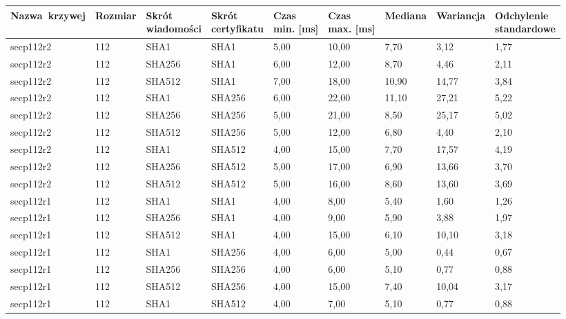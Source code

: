 \begin{longtable}{| l | l | l | l | l |l |l |l |l |}
\hline
\parbox[t]{25mm}{\centering Nazwa\ krzywej} & \parbox[t]{10mm}{\centering Rozmiar} & \parbox[t]{15mm}{\centering Skrót\\ wiadomości} & \parbox[t]{2cm}{\centering Skrót\\ certyfikatu} &  \parbox[t]{10mm}{\centering Czas\\  min. [ms]} & \parbox[t]{10mm}{\centering Czas\\ max. [ms]}  & \parbox[t]{2cm}{\centering Mediana} & \parbox[t]{2cm}{\centering Wariancja} & \parbox[t]{30mm}{\centering Odchylenie\\ standardowe} \\ \hline 
\endhead
secp112r2 & 112 & SHA1 & SHA1 & 5,00 & 10,00 & 7,70 & 3,12 & 1,77 \\ \hline 
secp112r2 & 112 & SHA256 & SHA1 & 6,00 & 12,00 & 8,70 & 4,46 & 2,11 \\ \hline 
secp112r2 & 112 & SHA512 & SHA1 & 7,00 & 18,00 & 10,90 & 14,77 & 3,84 \\ \hline 
secp112r2 & 112 & SHA1 & SHA256 & 6,00 & 22,00 & 11,10 & 27,21 & 5,22 \\ \hline 
secp112r2 & 112 & SHA256 & SHA256 & 5,00 & 21,00 & 8,50 & 25,17 & 5,02 \\ \hline 
secp112r2 & 112 & SHA512 & SHA256 & 5,00 & 12,00 & 6,80 & 4,40 & 2,10 \\ \hline 
secp112r2 & 112 & SHA1 & SHA512 & 4,00 & 15,00 & 7,70 & 17,57 & 4,19 \\ \hline 
secp112r2 & 112 & SHA256 & SHA512 & 5,00 & 17,00 & 6,90 & 13,66 & 3,70 \\ \hline 
secp112r2 & 112 & SHA512 & SHA512 & 5,00 & 16,00 & 8,60 & 13,60 & 3,69 \\ \hline 
secp112r1 & 112 & SHA1 & SHA1 & 4,00 & 8,00 & 5,40 & 1,60 & 1,26 \\ \hline 
secp112r1 & 112 & SHA256 & SHA1 & 4,00 & 9,00 & 5,90 & 3,88 & 1,97 \\ \hline 
secp112r1 & 112 & SHA512 & SHA1 & 4,00 & 15,00 & 6,10 & 10,10 & 3,18 \\ \hline 
secp112r1 & 112 & SHA1 & SHA256 & 4,00 & 6,00 & 5,00 & 0,44 & 0,67 \\ \hline 
secp112r1 & 112 & SHA256 & SHA256 & 4,00 & 6,00 & 5,10 & 0,77 & 0,88 \\ \hline 
secp112r1 & 112 & SHA512 & SHA256 & 4,00 & 15,00 & 7,40 & 10,04 & 3,17 \\ \hline 
secp112r1 & 112 & SHA1 & SHA512 & 4,00 & 7,00 & 5,10 & 0,77 & 0,88 \\ \hline 

\end{longtable}
